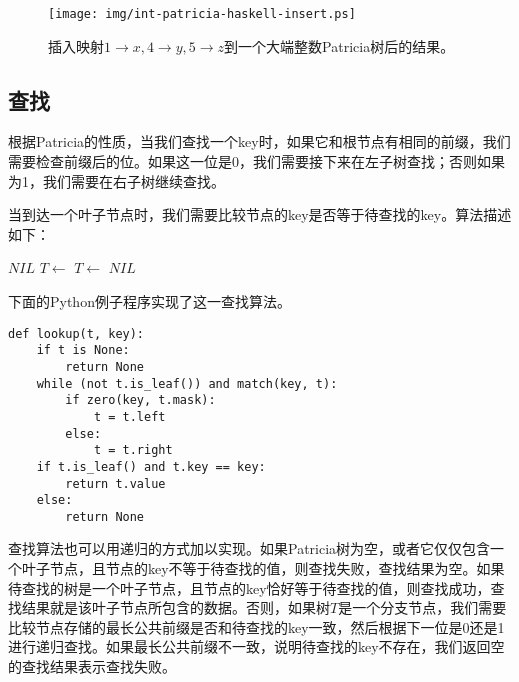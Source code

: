 \documentclass[UTF8]{article}
\begin{document}
\begin{figure}[htbp]
  \centering
  \texttt{[image: img/int-patricia-haskell-insert.ps]}
  \caption{插入映射$1 \rightarrow x, 4 \rightarrow y, 5 \rightarrow z$到一个大端整数Patricia树后的结果。}
  \label{fig:int-patricia-haskell-insert}
\end{figure}


\subsection{查找}

根据Patricia的性质，当我们查找一个key时，如果它和根节点有相同的前缀，我们需要检查前缀后的位。如果这一位是0，我们需要接下来在左子树查找；否则如果为1，我们需要在右子树继续查找。

当到达一个叶子节点时，我们需要比较节点的key是否等于待查找的key。算法描述如下：

\begin{algorithmic}[1]
    \State \Return $NIL$ 
  \EndIf
      \State $T \gets$ 
    \Else
      \State $T \gets$ 
    \EndIf
  \EndWhile
    \State \Return {}
  \Else
    \State \Return $NIL$ 
  \EndIf
\EndFunction
\end{algorithmic}

下面的Python例子程序实现了这一查找算法。

\lstset{language=Python}
\begin{lstlisting}
def lookup(t, key):
    if t is None:
        return None
    while (not t.is_leaf()) and match(key, t):
        if zero(key, t.mask):
            t = t.left
        else:
            t = t.right
    if t.is_leaf() and t.key == key:
        return t.value
    else:
        return None
\end{lstlisting}

查找算法也可以用递归的方式加以实现。如果Patricia树为空，或者它仅仅包含一个叶子节点，且节点的key不等于待查找的值，则查找失败，查找结果为空。如果待查找的树是一个叶子节点，且节点的key恰好等于待查找的值，则查找成功，查找结果就是该叶子节点所包含的数据。否则，如果树$T$是一个分支节点，我们需要比较节点存储的最长公共前缀是否和待查找的key一致，然后根据下一位是0还是1进行递归查找。如果最长公共前缀不一致，说明待查找的key不存在，我们返回空的查找结果表示查找失败。
\end{document}
